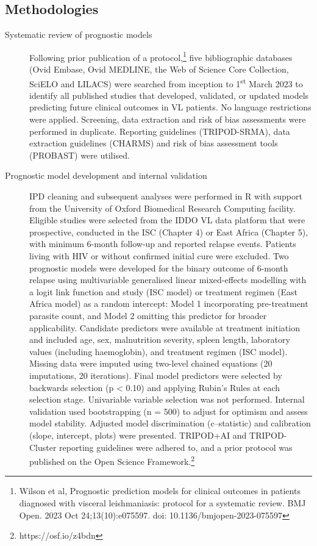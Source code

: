 \documentclass[11pt,a4paper]{article}
\begin{document}
\subsection*{Methodologies}
\begin{description}
    \item[Systematic review of prognostic models]
          Following prior publication of a protocol,\footnote{Wilson et al, Prognostic prediction models for clinical outcomes in patients diagnosed with visceral leishmaniasis: protocol for a systematic review. BMJ Open. 2023 Oct 24;13(10):e075597. doi: 10.1136/bmjopen-2023-075597} five bibliographic databases (Ovid Embase, Ovid MEDLINE, the Web of Science Core Collection, SciELO and LILACS) were searched from inception to 1\textsuperscript{st} March 2023 to identify all published studies that developed, validated, or updated models predicting future clinical outcomes in VL patients. No language restrictions were applied. Screening, data extraction and risk of bias assessments were performed in duplicate. Reporting guidelines (TRIPOD-SRMA), data extraction guidelines (CHARMS) and risk of bias assessment tools (PROBAST) were utilised.
    \item[Prognostic model development and internal validation]
          IPD cleaning and subsequent analyses were performed in R with support from the University of Oxford Biomedical Research Computing facility. Eligible studies were selected from the IDDO VL data platform that were prospective, conducted in the ISC (Chapter 4) or East Africa (Chapter 5), with minimum 6-month follow-up and reported relapse events. Patients living with HIV or without confirmed initial cure were excluded. Two prognostic models were developed for the binary outcome of 6-month relapse using multivariable generalised linear mixed-effects modelling with a logit link function and study (ISC model) or treatment regimen (East Africa model) as a random intercept: Model 1 incorporating pre-treatment parasite count, and Model 2 omitting this predictor for broader applicability. Candidate predictors were available at treatment initiation and included age, sex, malnutrition severity, spleen length, laboratory values (including haemoglobin), and treatment regimen (ISC model). Missing data were imputed using two-level chained equations (20 imputations, 20 iterations). Final model predictors were selected by backwards selection (p < 0.10) and  applying Rubin's Rules at each selection stage. Univariable variable selection was not performed. Internal validation used bootstrapping (n = 500) to adjust for optimism and assess model stability. Adjusted model discrimination (c--statistic) and calibration (slope, intercept, plots) were presented. TRIPOD+AI and TRIPOD-Cluster reporting guidelines were adhered to, and a prior protocol was published on the Open Science Framework.\footnote{https://osf.io/z4bdn}
\end{description}
\end{document}
